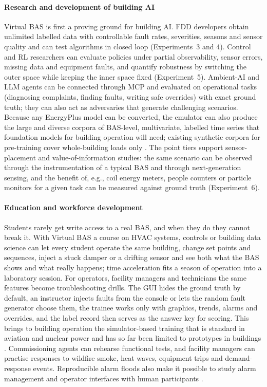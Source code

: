 \documentclass[preprint,12pt,authoryear=false]{elsarticle}
\begin{document}
\paragraph{Research and development of building AI} Virtual BAS is first a proving ground for building AI. FDD
developers obtain unlimited labelled data with controllable fault rates, severities, seasons and sensor quality and
can test algorithms in closed loop (Experiments~3 and 4). Control and RL researchers can evaluate policies under partial
observability, sensor errors, missing data and equipment faults, and quantify robustness by switching the outer space
while keeping the inner space fixed (Experiment~5). Ambient-AI and LLM agents can be connected through MCP and
evaluated on operational tasks (diagnosing complaints, finding faults, writing safe overrides) with exact ground
truth; they can also act as adversaries that generate challenging scenarios. Because any EnergyPlus model can be
converted, the emulator can also produce the large and diverse corpora of BAS-level, multivariate, labelled time
series that foundation models for building operation will need; existing synthetic corpora for pre-training cover
whole-building loads only \cite{emami2023buildingsbench}. The point tiers support sensor-placement and
value-of-information studies: the same scenario can be observed through the instrumentation of a typical BAS and
through next-generation sensing, and the benefit of, e.g., coil energy meters, people counters or particle monitors for
a given task can be measured against ground truth (Experiment~6).

\paragraph{Education and workforce development} Students rarely get write access to a real BAS, and when they do they
cannot break it. With Virtual BAS a course on HVAC systems, controls or building data science can let every student
operate the same building, change set points and sequences, inject a stuck damper or a drifting sensor and see both
what the BAS shows and what really happens; time acceleration fits a season of operation into a laboratory session.
For operators, facility managers and technicians the same features become troubleshooting drills. The GUI hides the
ground truth by default, an instructor injects faults from the console or lets the random fault generator choose them,
the trainee works only with graphics, trends, alarms and overrides, and the label record then serves as the answer key
for scoring. This brings to building operation the simulator-based training that is standard in aviation and nuclear
power \cite{ans35} and has so far been limited to prototypes in buildings \cite{xu2004training,johra2020geenie}.
Commissioning agents can rehearse functional tests, and facility managers can practise responses to wildfire smoke,
heat waves, equipment trips and demand-response events. Reproducible alarm floods also make it possible to study
alarm management and operator interfaces with human participants \cite{isa182}.
\end{document}
